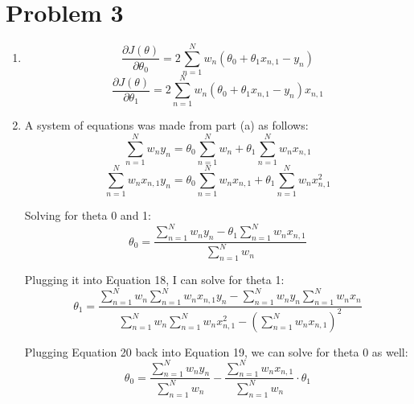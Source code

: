 \documentclass[11pt]{article}
\begin{document}
\section{Problem 3}
    \begin{enumerate}
        \item 
            \begin{equation}
                \frac{\partial J(\theta)}{\partial \theta _{0}} = 
                    2\sum_{n=1}^{N} w_{n}(\theta _{0} + \theta _{1}x_{n,1}-y_{n})
            \end{equation}
            \begin{equation}
                \frac{\partial J(\theta)}{\partial \theta _{1}} = 
                    2\sum_{n=1}^{N} w_{n}(\theta _{0} + \theta _{1}x_{n,1}-y_{n})x_{n,1}
            \end{equation}
        
        \item
            A system of equations was made from part (a) as follows:
            \begin{equation}
                \sum_{n=1}^{N} w_{n}y_{n} = \theta _{0} \sum_{n=1}^{N}w_{n} + \theta _{1}\sum_{n=1}^{N} w_{n}x_{n,1}
            \end{equation}
            \begin{equation}
                \sum_{n=1}^{N} w_{n}x_{n,1}y_{n} = \theta _{0} \sum_{n=1}^{N}w_{n}x_{n,1} + \theta _{1}\sum_{n=1}^{N} w_{n}x_{n,1}^{2}
            \end{equation}
            
            Solving for theta 0 and 1:
            \begin{equation}
                \theta _{0} = \frac{\sum_{n=1}^{N}w_{n}y_{n} - \theta _{1}\sum_{n=1}^{N}w_{n}x_{n,1}}{\sum_{n=1}^{N}w_{n}}
            \end{equation}
            
            Plugging it into Equation 18, I can solve for theta 1:
            \begin{equation}
                \theta _{1} = \frac{\sum_{n=1}^{N}w_{n} \sum_{n=1}^{N}w_{n}x_{n,1}y_{n} - \sum_{n=1}^{N}w_{n}y_{n}\sum_{n=1}^{N}w_{n}x_{n}}{\sum_{n=1}^{N}w_{n} \sum_{n=1}^{N}w_{n}x_{n,1}^{2} - (\sum_{n=1}^{N}w_{n}x_{n,1})^{2}}
            \end{equation}
            
            Plugging Equation 20 back into Equation 19, we can solve for theta 0 as well:
            \begin{equation}
                \theta _{0} = 
                    \frac{\sum_{n=1}^{N}w_{n}y_{n}}{\sum_{n=1}^{N}w_{n}} -
                    \frac{\sum_{n=1}^{N}w_{n}x_{n,1}}{\sum_{n=1}^{N}w_{n}}
                    \cdot
                    \theta _{1}
            \end{equation}
        
    \end{enumerate}


\end{document}
